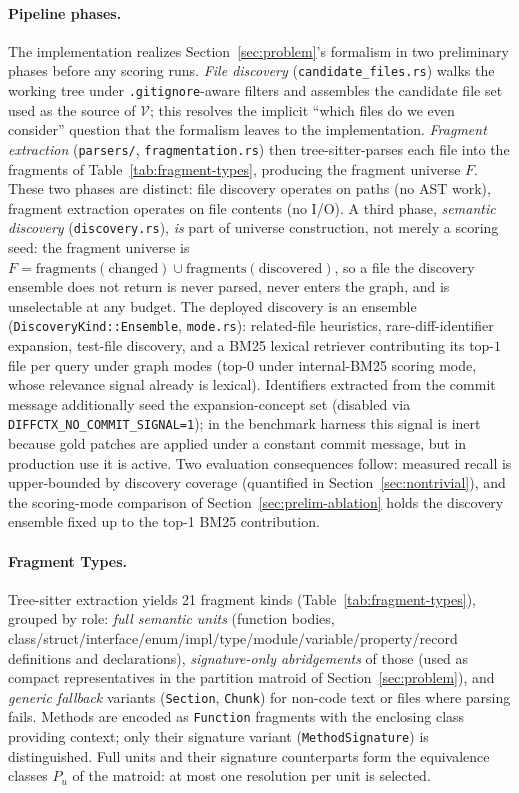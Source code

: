\documentclass[11pt, a4paper]{article}
\begin{document}
\paragraph{Pipeline phases.} The implementation realizes Section~\ref{sec:problem}'s formalism in two preliminary phases before any scoring runs. \emph{File discovery} (\texttt{candidate\_files.rs}) walks the working tree under \texttt{.gitignore}-aware filters and assembles the candidate file set used as the source of $\mathcal{V}$; this resolves the implicit ``which files do we even consider'' question that the formalism leaves to the implementation. \emph{Fragment extraction} (\texttt{parsers/}, \texttt{fragmentation.rs}) then tree-sitter-parses each file into the fragments of Table~\ref{tab:fragment-types}, producing the fragment universe $F$. These two phases are distinct: file discovery operates on paths (no AST work), fragment extraction operates on file contents (no I/O). A third phase, \emph{semantic discovery} (\texttt{discovery.rs}), \emph{is} part of universe construction, not merely a scoring seed: the fragment universe is $F = \mathrm{fragments}(\mathrm{changed}) \cup \mathrm{fragments}(\mathrm{discovered})$, so a file the discovery ensemble does not return is never parsed, never enters the graph, and is unselectable at any budget. The deployed discovery is an ensemble (\texttt{DiscoveryKind::Ensemble}, \texttt{mode.rs}): related-file heuristics, rare-diff-identifier expansion, test-file discovery, and a BM25 lexical retriever contributing its top-$1$ file per query under graph modes (top-$0$ under internal-BM25 scoring mode, whose relevance signal already is lexical). Identifiers extracted from the commit message additionally seed the expansion-concept set (disabled via \texttt{DIFFCTX\_NO\_COMMIT\_SIGNAL=1}); in the benchmark harness this signal is inert because gold patches are applied under a constant commit message, but in production use it is active. Two evaluation consequences follow: measured recall is upper-bounded by discovery coverage (quantified in Section~\ref{sec:nontrivial}), and the scoring-mode comparison of Section~\ref{sec:prelim-ablation} holds the discovery ensemble fixed up to the top-1 BM25 contribution.

\paragraph{Fragment Types.} Tree-sitter extraction yields 21 fragment kinds (Table~\ref{tab:fragment-types}), grouped by role: \emph{full semantic units} (function bodies, class/struct/interface/enum/impl/type/module/variable/property/record definitions and declarations), \emph{signature-only abridgements} of those (used as compact representatives in the partition matroid of Section~\ref{sec:problem}), and \emph{generic fallback} variants (\texttt{Section}, \texttt{Chunk}) for non-code text or files where parsing fails. Methods are encoded as \texttt{Function} fragments with the enclosing class providing context; only their signature variant (\texttt{MethodSignature}) is distinguished. Full units and their signature counterparts form the equivalence classes $P_u$ of the matroid: at most one resolution per unit is selected.
\end{document}
